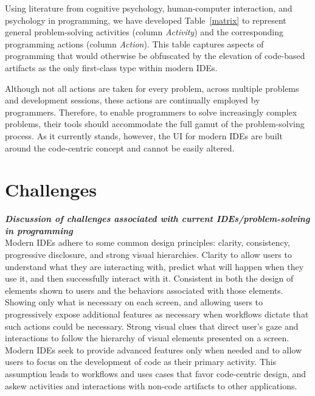 \documentclass{ppig}
\newcommand{\bold}[1]{\textit{\textbf{\color{aoblue}#1}}}
\begin{document}
Using literature from cognitive psychology, human-computer interaction, and psychology in programming, we have developed Table~\ref{matrix} to represent general problem-solving activities (column \textit{Activity}) and the corresponding programming actions (column \textit{Action}).
This table captures aspects of programming that would otherwise be obfuscated by the elevation of code-based artifacts as the only first-class type within modern IDEs.

Although not all actions are taken for every problem, across multiple problems and development sessions, these actions are continually employed by programmers.
Therefore, to enable programmers to solve increasingly complex problems, their tools should accommodate the full gamut of the problem-solving process.
As it currently stands, however, the UI for modern IDEs are built around the code-centric concept and cannot be easily altered.

\section{Challenges}
\bold{Discussion of challenges associated with current IDEs/problem-solving in programming\\}
Modern IDEs adhere to some common design principles: clarity, consistency, progressive disclosure, and strong visual hierarchies.
Clarity to allow users to understand what they are interacting with, predict what will happen when they use it, and then successfully interact with it.
Consistent in both the design of elements shown to users and the behaviors associated with those elements.
Showing only what is necessary on each screen, and allowing users to progressively expose additional features as necessary when workflows dictate that such actions could be necessary.
Strong visual clues that direct user's gaze and interactions to follow the hierarchy of visual elements presented on a screen.
Modern IDEs seek to provide advanced features only when needed and to allow users to focus on the development of code as their primary activity.
This assumption leads to workflows and uses cases that favor code-centric design, and askew activities and interactions with non-code artifacts to other applications.
\end{document}
